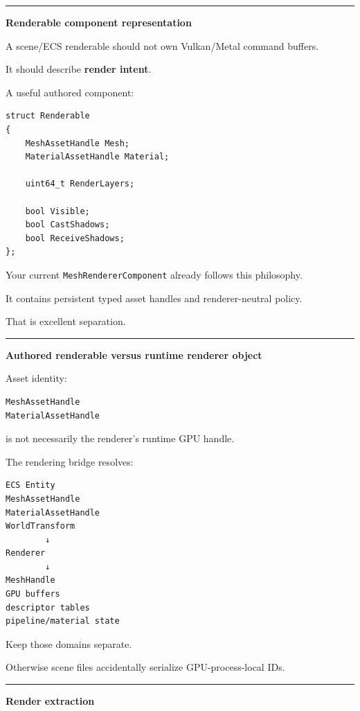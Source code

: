 \begin{center}\rule{0.5\linewidth}{0.5pt}\end{center}

\textbf{Renderable component representation}

A scene/ECS renderable should not own Vulkan/Metal command buffers.

It should describe \textbf{render intent}.

A useful authored component:

\begin{verbatim}
struct Renderable
{
    MeshAssetHandle Mesh;
    MaterialAssetHandle Material;

    uint64_t RenderLayers;

    bool Visible;
    bool CastShadows;
    bool ReceiveShadows;
};
\end{verbatim}

Your current \texttt{MeshRendererComponent} already follows this philosophy.

It contains persistent typed asset handles and renderer-neutral policy.

That is excellent separation.

\begin{center}\rule{0.5\linewidth}{0.5pt}\end{center}

\textbf{Authored renderable versus runtime renderer object}

Asset identity:

\begin{verbatim}
MeshAssetHandle
MaterialAssetHandle
\end{verbatim}

is not necessarily the renderer's runtime GPU handle.

The rendering bridge resolves:

\begin{verbatim}
ECS Entity
MeshAssetHandle
MaterialAssetHandle
WorldTransform
        ↓
Renderer
        ↓
MeshHandle
GPU buffers
descriptor tables
pipeline/material state
\end{verbatim}

Keep those domains separate.

Otherwise scene files accidentally serialize GPU-process-local IDs.

\begin{center}\rule{0.5\linewidth}{0.5pt}\end{center}

\textbf{Render extraction}

